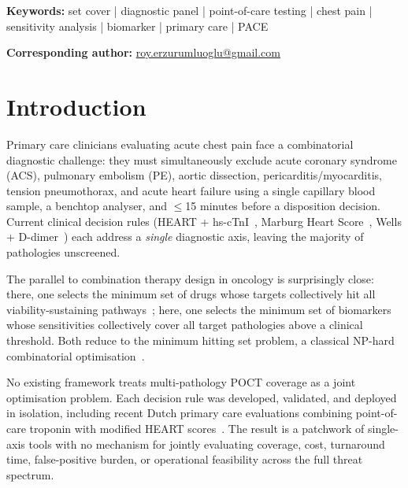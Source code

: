 \documentclass[11pt, oneside]{article}
\newenvironment{keywords}{\noindent\textbf{Keywords:} }{\par}%
\begin{document}
\begin{keywords}
set cover | diagnostic panel | point-of-care testing | chest pain | sensitivity analysis | biomarker | primary care | PACE
\end{keywords}

\noindent\textbf{Corresponding author:} \href{mailto:roy.erzurumluoglu@gmail.com}{roy.erzurumluoglu@gmail.com}

\newpage
\raggedbottom
\sloppy

\renewcommand{\dbltopfraction}{0.9}
\renewcommand{\textfraction}{0.07}
\renewcommand{\dblfloatpagefraction}{0.7}
\setcounter{dbltopnumber}{2}
\setcounter{topnumber}{3}
\setcounter{totalnumber}{5}


\section{Introduction}
\label{sec:introduction}

Primary care clinicians evaluating acute chest pain face a combinatorial diagnostic challenge: they must simultaneously exclude acute coronary syndrome (ACS), pulmonary embolism (PE), aortic dissection, pericarditis/myocarditis, tension pneumothorax, and acute heart failure using a single capillary blood sample, a benchtop analyser, and $\leq$15 minutes before a disposition decision. Current clinical decision rules (HEART + hs-cTnI~\cite{Backus2013,Schols2019,Willemsen2021}, Marburg Heart Score~\cite{Schols2018}, Wells + D-dimer~\cite{Geersing2012}) each address a \emph{single} diagnostic axis, leaving the majority of pathologies unscreened.

The parallel to combination therapy design in oncology is surprisingly close: there, one selects the minimum set of drugs whose targets collectively hit all viability-sustaining pathways~\cite{VeraLicona2013,Erzurumluoglu2026ALIN}; here, one selects the minimum set of biomarkers whose sensitivities collectively cover all target pathologies above a clinical threshold. Both reduce to the minimum hitting set problem, a classical NP-hard combinatorial optimisation~\cite{Chvatal1979}.

No existing framework treats multi-pathology POCT coverage as a joint optimisation problem. Each decision rule was developed, validated, and deployed in isolation, including recent Dutch primary care evaluations combining point-of-care troponin with modified HEART scores~\cite{Willemsen2021}. The result is a patchwork of single-axis tools with no mechanism for jointly evaluating coverage, cost, turnaround time, false-positive burden, or operational feasibility across the full threat spectrum.
\end{document}
